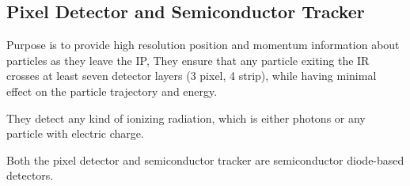     \subsection{Pixel Detector and Semiconductor Tracker}
        Purpose is to provide high resolution position and momentum information about particles as they leave the IP,
        They ensure that any particle exiting the IR crosses at least seven detector layers (3 pixel, 4 strip), while having minimal effect on the particle trajectory and energy.


        They detect any kind of ionizing radiation, which is either photons or any particle with electric charge.

        Both the pixel detector and semiconductor tracker are semiconductor diode-based detectors.

